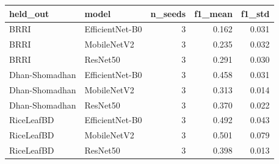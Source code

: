 \begin{tabular}{llrrr}
\toprule
held_out & model & n_seeds & f1_mean & f1_std \\
\midrule
BRRI & EfficientNet-B0 & 3 & 0.162 & 0.031 \\
BRRI & MobileNetV2 & 3 & 0.235 & 0.032 \\
BRRI & ResNet50 & 3 & 0.291 & 0.030 \\
Dhan-Shomadhan & EfficientNet-B0 & 3 & 0.458 & 0.031 \\
Dhan-Shomadhan & MobileNetV2 & 3 & 0.313 & 0.014 \\
Dhan-Shomadhan & ResNet50 & 3 & 0.370 & 0.022 \\
RiceLeafBD & EfficientNet-B0 & 3 & 0.492 & 0.043 \\
RiceLeafBD & MobileNetV2 & 3 & 0.501 & 0.079 \\
RiceLeafBD & ResNet50 & 3 & 0.398 & 0.013 \\
\bottomrule
\end{tabular}
